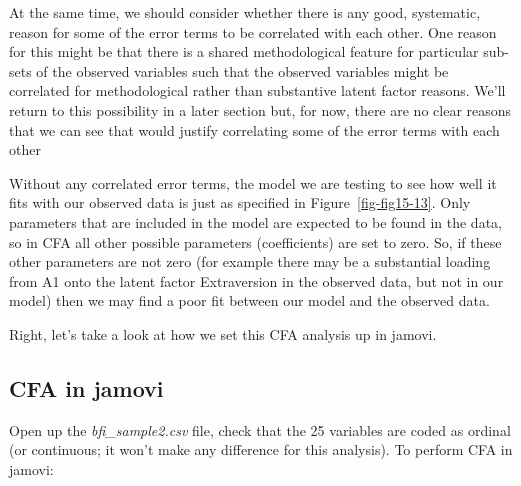 \documentclass[
  a4paper,
]{book}
\begin{document}
At the same time, we should consider whether there is any good,
systematic, reason for some of the error terms to be correlated with
each other. One reason for this might be that there is a shared
methodological feature for particular sub-sets of the observed variables
such that the observed variables might be correlated for methodological
rather than substantive latent factor reasons. We'll return to this
possibility in a later section but, for now, there are no clear reasons
that we can see that would justify correlating some of the error terms
with each other

Without any correlated error terms, the model we are testing to see how
well it fits with our observed data is just as specified in
Figure~\ref{fig-fig15-13}. Only parameters that are included in the
model are expected to be found in the data, so in CFA all other possible
parameters (coefficients) are set to zero. So, if these other parameters
are not zero (for example there may be a substantial loading from A1
onto the latent factor Extraversion in the observed data, but not in our
model) then we may find a poor fit between our model and the observed
data.

Right, let's take a look at how we set this CFA analysis up in jamovi.

\hypertarget{cfa-in-jamovi}{%
\subsection{CFA in jamovi}\label{cfa-in-jamovi}}

Open up the \emph{bfi\_sample2.csv} file, check that the 25 variables
are coded as ordinal (or continuous; it won't make any difference for
this analysis). To perform CFA in jamovi:
\end{document}
